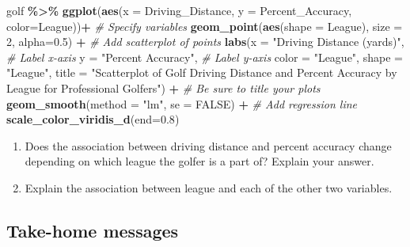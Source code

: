 \documentclass[
]{report}
\newenvironment{Shaded}{\begin{snugshade}}{\end{snugshade}}
\newcommand{\AttributeTok}[1]{\textcolor[rgb]{0.13,0.29,0.53}{#1}}
\newcommand{\CommentTok}[1]{\textcolor[rgb]{0.56,0.35,0.01}{\textit{#1}}}
\newcommand{\ConstantTok}[1]{\textcolor[rgb]{0.56,0.35,0.01}{#1}}
\newcommand{\DecValTok}[1]{\textcolor[rgb]{0.00,0.00,0.81}{#1}}
\newcommand{\FloatTok}[1]{\textcolor[rgb]{0.00,0.00,0.81}{#1}}
\newcommand{\FunctionTok}[1]{\textcolor[rgb]{0.13,0.29,0.53}{\textbf{#1}}}
\newcommand{\NormalTok}[1]{#1}
\newcommand{\SpecialCharTok}[1]{\textcolor[rgb]{0.81,0.36,0.00}{\textbf{#1}}}
\newcommand{\StringTok}[1]{\textcolor[rgb]{0.31,0.60,0.02}{#1}}
\begin{document}
\begin{Shaded}
\begin{Highlighting}[]
\NormalTok{golf }\SpecialCharTok{\%\textgreater{}\%}
  \FunctionTok{ggplot}\NormalTok{(}\FunctionTok{aes}\NormalTok{(}\AttributeTok{x =}\NormalTok{ Driving\_Distance, }\AttributeTok{y =}\NormalTok{ Percent\_Accuracy, }\AttributeTok{color=}\NormalTok{League))}\SpecialCharTok{+}  \CommentTok{\# Specify variables}
  \FunctionTok{geom\_point}\NormalTok{(}\FunctionTok{aes}\NormalTok{(}\AttributeTok{shape =}\NormalTok{ League), }\AttributeTok{size =} \DecValTok{2}\NormalTok{, }\AttributeTok{alpha=}\FloatTok{0.5}\NormalTok{) }\SpecialCharTok{+}  \CommentTok{\# Add scatterplot of points}
  \FunctionTok{labs}\NormalTok{(}\AttributeTok{x =} \StringTok{"Driving Distance (yards)"}\NormalTok{,  }\CommentTok{\# Label x{-}axis}
       \AttributeTok{y =} \StringTok{"Percent Accuracy"}\NormalTok{,  }\CommentTok{\# Label y{-}axis}
       \AttributeTok{color =} \StringTok{"League"}\NormalTok{, }\AttributeTok{shape =} \StringTok{"League"}\NormalTok{,}
       \AttributeTok{title =} \StringTok{"Scatterplot of Golf Driving Distance and Percent }
\StringTok{       Accuracy by League for Professional Golfers"}\NormalTok{) }\SpecialCharTok{+} \CommentTok{\# Be sure to title your plots}
  \FunctionTok{geom\_smooth}\NormalTok{(}\AttributeTok{method =} \StringTok{"lm"}\NormalTok{, }\AttributeTok{se =} \ConstantTok{FALSE}\NormalTok{) }\SpecialCharTok{+} \CommentTok{\# Add regression line}
    \FunctionTok{scale\_color\_viridis\_d}\NormalTok{(}\AttributeTok{end=}\FloatTok{0.8}\NormalTok{)}
\end{Highlighting}
\end{Shaded}

\begin{enumerate}
\def\labelenumi{\arabic{enumi}.}
\setcounter{enumi}{14}
\item
  Does the association between driving distance and percent accuracy change depending on which league the golfer is a part of? Explain your answer.
  \vspace{1in}
\item
  Explain the association between league and each of the other two variables.
\end{enumerate}

\newpage

\newpage

\hypertarget{take-home-messages-23}{%
\subsection{Take-home messages}\label{take-home-messages-23}}
\end{document}
